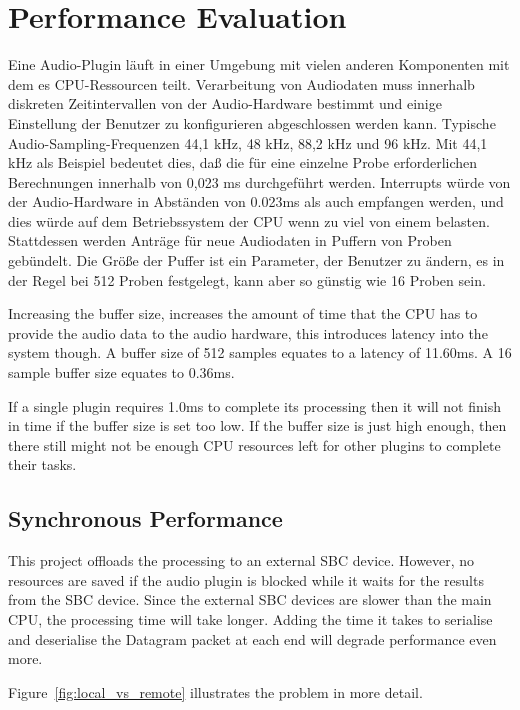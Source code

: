 \section{Performance Evaluation}

Eine Audio-Plugin läuft in einer Umgebung mit vielen anderen Komponenten mit dem es CPU-Ressourcen teilt. Verarbeitung von Audiodaten muss innerhalb diskreten Zeitintervallen von der Audio-Hardware bestimmt und einige Einstellung der Benutzer zu konfigurieren abgeschlossen werden kann. Typische Audio-Sampling-Frequenzen 44,1 kHz, 48 kHz, 88,2 kHz und 96 kHz. Mit 44,1 kHz als Beispiel bedeutet dies, daß die für eine einzelne Probe erforderlichen Berechnungen innerhalb von 0,023 ms durchgeführt werden. Interrupts würde von der Audio-Hardware in Abständen von 0.023ms als auch empfangen werden, und dies würde auf dem Betriebssystem der CPU wenn zu viel von einem belasten. Stattdessen werden Anträge für neue Audiodaten in Puffern von Proben gebündelt. Die Größe der Puffer ist ein Parameter, der Benutzer zu ändern, es in der Regel bei 512 Proben festgelegt, kann aber so günstig wie 16 Proben sein.

Increasing the buffer size, increases the amount of time that the CPU has to provide the audio data to the audio hardware, this introduces latency into the system though. A buffer size of 512 samples equates to a latency of 11.60ms. A 16 sample buffer size equates to 0.36ms.

If a single plugin requires 1.0ms to complete its processing then it will not finish in time if the buffer size is set too low. If the buffer size is just high enough, then there still might not be enough CPU resources left for other plugins to complete their tasks.

\subsection{Synchronous Performance}

This project offloads the processing to an external SBC device. However, no resources are saved if the audio plugin is blocked while it waits for the results from the SBC device. Since the external SBC devices are slower than the main CPU, the processing time will take longer. Adding the time it takes to serialise and deserialise the Datagram packet at each end will degrade performance even more.

Figure~\ref{fig:local_vs_remote} illustrates the problem in more detail.

